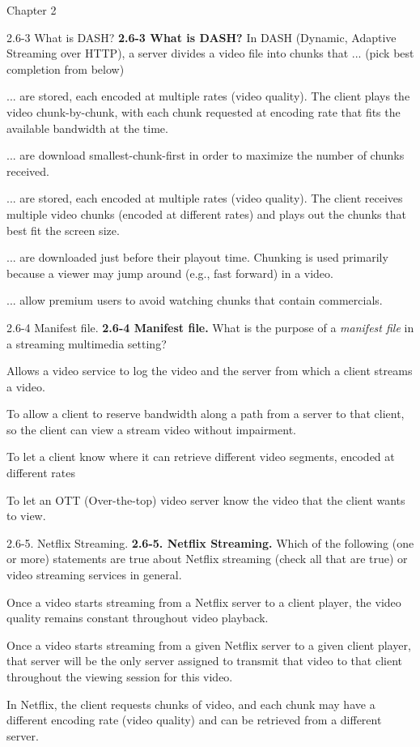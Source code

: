 \documentclass[a4paper]{article}
\begin{document}
\begin{quiz}{Chapter 2}
\begin{multi}[points=1,shuffle]{2.6-3 What is DASH?}
\textbf{2.6-3 What is DASH?} 
In DASH (Dynamic, Adaptive Streaming over HTTP), a server divides a video file into chunks that ... (pick best completion from below)
\item* ... are stored, each encoded at multiple rates (video quality). The client plays the video chunk-by-chunk, with each chunk requested at encoding rate that fits the available bandwidth at the time.
\item ... are download smallest-chunk-first in order to maximize the number of chunks received.
\item ... are stored, each encoded at multiple rates (video quality). The client receives multiple video chunks (encoded at different rates) and plays out the chunks that best fit the screen size.
\item ... are downloaded just before their playout time. Chunking is used primarily because a viewer may jump around (e.g., fast forward) in a video.
\item ... allow premium users to avoid watching chunks that contain commercials.
\end{multi}

\begin{multi}[points=1,shuffle]{2.6-4 Manifest file.}
\textbf{2.6-4 Manifest file.} 
What is the purpose of a \emph{manifest file} in a streaming multimedia setting?
\item Allows a video service to log the video and the server from which a client streams a video.
\item To allow a client to reserve bandwidth along a path from a server to that client, so the client can view a stream video without impairment.
\item* To let a client know where it can retrieve different video segments, encoded at different rates
\item To let an OTT (Over-the-top) video server know the video that the client wants to view.
\end{multi}

\begin{multi}[points=1,shuffle,multiple]{2.6-5. Netflix Streaming.}
\textbf{2.6-5. Netflix Streaming.}  
Which of the following (one or more) statements are true about Netflix streaming (check all that are true) or video streaming services in general.
\item Once a video starts streaming from a Netflix server to a client player, the video quality remains constant throughout video playback.
\item Once a video starts streaming from a given Netflix server to a given client player, that server will be the only server assigned to transmit that video to that client throughout the viewing session for this video.
\item* In Netflix, the client requests chunks of video, and each chunk may have a different encoding rate (video quality) and can be retrieved from a different server.
\end{multi}


\end{quiz}
\end{document}
